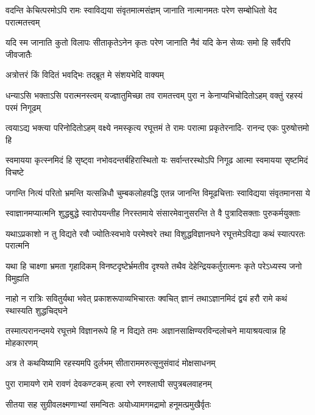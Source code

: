 \fourlineindentedshloka
{वदन्ति केचित्परमोऽपि रामः}
{स्वाविद्यया संवृतमात्मसंज्ञम्}
{जानाति नात्मानमतः परेण}
{सम्बोधितो वेद परात्मतत्त्वम्} %

\fourlineindentedshloka
{यदि स्म जानाति कुतो विलापः}
{सीताकृतेऽनेन कृतः परेण}
{जानाति नैवं यदि केन सेव्यः}
{समो हि सर्वैरपि जीवजातैः} %

\twolineshloka
{अत्रोत्तरं किं विदितं भवद्भिः}
{तद्ब्रूत मे संशयभेदि वाक्यम्} %


\fourlineindentedshloka
{धन्याऽसि भक्ताऽसि परात्मनस्त्वम्}
{यज्ज्ञातुमिच्छा तव रामतत्त्वम्}
{पुरा न केनाप्यभिचोदितोऽहम्}
{वक्तुं रहस्यं परमं निगूढम्} %

\fourlineindentedshloka
{त्वयाऽद्य भक्त्या परिनोदितोऽहम्}
{वक्ष्ये नमस्कृत्य रघूत्तमं ते}
{रामः परात्मा प्रकृतेरनादि-}
{रानन्द एकः पुरुषोत्तमो हि} %

\fourlineindentedshloka
{स्वमायया कृत्स्नमिदं हि सृष्ट्वा}
{नभोवदन्तर्बहिरास्थितो यः}
{सर्वान्तरस्थोऽपि निगूढ आत्मा}
{स्वमायया सृष्टमिदं विचष्टे} %

\fourlineindentedshloka
{जगन्ति नित्यं परितो भ्रमन्ति}
{यत्सन्निधौ चुम्बकलोहवद्धि}
{एतन्न जानन्ति विमूढचित्ताः}
{स्वाविद्यया संवृतमानसा ये} %

\fourlineindentedshloka
{स्वाज्ञानमप्यात्मनि शुद्धबुद्धे}
{स्वारोपयन्तीह निरस्तमाये}
{संसारमेवानुसरन्ति ते वै}
{पुत्रादिसक्ताः पुरुकर्मयुक्ताः} %

\fourlineindentedshloka
{यथाऽप्रकाशो न तु विद्यते रवौ}
{ज्योतिःस्वभावे परमेश्वरे तथा}
{विशुद्धविज्ञानघने रघूत्तमेऽविद्या}
{कथं स्यात्परतः परात्मनि} %

\fourlineindentedshloka
{यथा हि चाक्ष्णा भ्रमता गृहादिकम्}
{विनष्टदृष्टेर्भ्रमतीव दृश्यते}
{तथैव देहेन्द्रियकर्तुरात्मनः}
{कृते परेऽध्यस्य जनो विमुह्यति} %

\fourlineindentedshloka
{नाहो न रात्रिः सवितुर्यथा भवेत्}
{प्रकाशरूपाव्यभिचारतः क्वचित्}
{ज्ञानं तथाऽज्ञानमिदं द्वयं हरौ}
{रामे कथं स्थास्यति शुद्धचिद्घने} %

\fourlineindentedshloka
{तस्मात्परानन्दमये रघूत्तमे}
{विज्ञानरूपे हि न विद्यते तमः}
{अज्ञानसाक्षिण्यरविन्दलोचने}
{मायाश्रयत्वान्न हि मोहकारणम्} %

\twolineshloka
{अत्र ते कथयिष्यामि रहस्यमपि दुर्लभम्}
{सीताराममरुत्सूनुसंवादं मोक्षसाधनम्} %

\twolineshloka
{पुरा रामायणे रामे रावणं देवकण्टकम्}
{हत्वा रणे रणश्लाघी सपुत्रबलवाहनम्} %

\twolineshloka
{सीतया सह सुग्रीवलक्ष्मणाभ्यां समन्वितः}
{अयोध्यामगमद्रामो हनूमत्प्रमुखैर्वृतः} %

